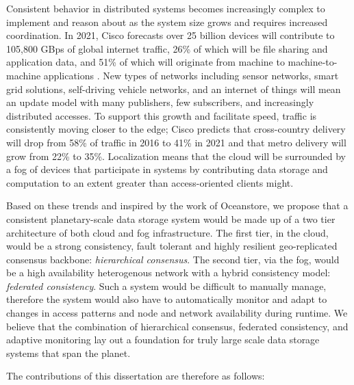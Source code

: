 Consistent behavior in distributed systems becomes increasingly complex to implement and reason about as the system size grows and requires increased coordination.
In 2021, Cisco forecasts over 25 billion devices will contribute to 105,800 GBps of global internet traffic, 26\% of which will be file sharing and application data, and 51\% of which will originate from machine to machine-to-machine applications \cite{cisco_internet_trends}.
New types of networks including sensor networks, smart grid solutions, self-driving vehicle networks, and an internet of things will mean an update model with many publishers, few subscribers, and increasingly distributed accesses.
To support this growth and facilitate speed, traffic is consistently moving closer to the edge; Cisco predicts that cross-country delivery will drop from 58\% of traffic in 2016 to 41\% in 2021 and that metro delivery will grow from 22\% to 35\%.
Localization means that the cloud will be surrounded by a fog of devices that participate in systems by contributing data storage and computation to an extent greater than access-oriented clients might.

Based on these trends and inspired by the work of Oceanstore, we propose that a consistent planetary-scale data storage system would be made up of a two tier architecture of both cloud and fog infrastructure.
The first tier, in the cloud, would be a strong consistency, fault tolerant and highly resilient geo-replicated consensus backbone: \emph{hierarchical consensus}.
The second tier, via the fog, would be a high availability heterogenous network with a hybrid consistency model: \emph{federated consistency}.
Such a system would be difficult to manually manage, therefore the system would also have to automatically monitor and adapt to changes in access patterns and node and network availability during runtime.
We believe that the combination of hierarchical consensus, federated consistency, and adaptive monitoring lay out a foundation for truly large scale data storage systems that span the planet.

The contributions of this dissertation are therefore as follows:

